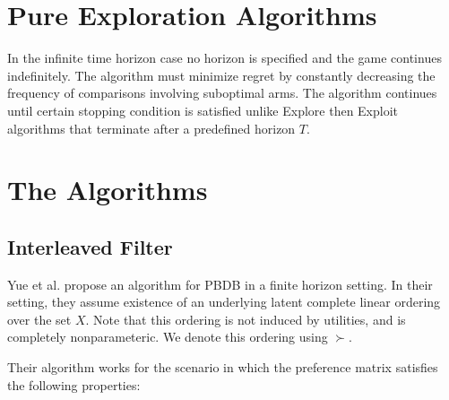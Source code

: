 \documentclass[MSc,beforeExam]{iitcsthesis}
\begin{document}
	\section{Pure Exploration Algorithms}
	In the infinite time horizon case no horizon is specified and the game  continues indefinitely.
	The algorithm  must minimize regret by constantly  decreasing the frequency of comparisons involving suboptimal arms. %
	The algorithm continues until certain stopping condition is satisfied unlike Explore then Exploit algorithms that terminate after a predefined horizon $T$. 

	\section{The Algorithms}
\subsection{Interleaved Filter}
	Yue et al. \cite{yue2012k} propose an algorithm for PBDB in  a finite horizon setting.
	In their setting, they assume existence of an underlying latent complete linear ordering
	over the set $X$.  Note that this ordering is not induced by utilities, and is completely
	nonparameteric.  We denote this ordering using $\succ$.
	
	Their algorithm works for the scenario in which the preference matrix satisfies the following properties:
\end{document}
